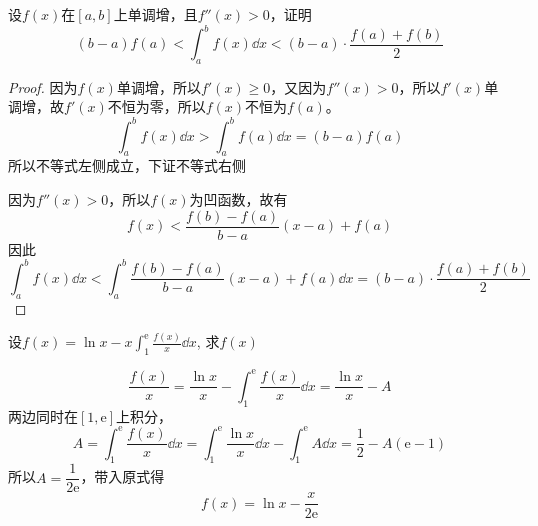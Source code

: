 \begin{example}
    设$f(x)$在$[a,b]$上单调增，且$f''(x)>0$，证明
    \[ (b-a)f(a)<\int_a^bf(x)\dd{x} < (b-a)\cdot\frac{f(a)+f(b)}{2} \]
\end{example}
\begin{marginfigure}
    \caption{$S_\mathrm{A} < S_\mathrm{A}+S_\mathrm{B} < S_\text{A}+S_\mathrm{B}+S_\mathrm{C} $}
\end{marginfigure}
\begin{proof}
    因为$f(x)$单调增，所以$f'(x)\geq 0$，又因为$f''(x)>0$，所以$f'(x)$单调增，故$f'(x)$不恒为零，所以$f(x)$不恒为$f(a)$。
    \[ \int_a^bf(x)\dd{x} > \int_a^b f(a)\dd{x} =(b-a)f(a) \]
    所以不等式左侧成立，下证不等式右侧

    因为$f''(x)>0$，所以$f(x)$为凹函数，故有
    \[ f(x) < \frac{f(b)-f(a)}{b-a}(x-a) + f(a) \]
    因此
    \[
        \int_a^bf(x)\dd{x}
        <
        \int_a^b \frac{f(b)-f(a)}{b-a}(x-a) + f(a) \dd{x}
        =
        (b-a)\cdot\frac{f(a)+f(b)}{2}
    \]
\end{proof}

\begin{example}
    设$\displaystyle f(x) = \ln x - x\int_1^\mathrm{e}\frac{f(x)}{x}\dd{x}$,
    求$f(x)$
\end{example}
\begin{solution}
    \[
        \frac{f(x)}{x} = \frac{\ln x}{x} - \int_1^\mathrm{e}\frac{f(x)}{x}\dd{x}
        =
        \frac{\ln x}{x} - A
    \]
    两边同时在$[1,\mathrm{e}]$上积分，
    \[
        A
        =
        \int_1^\mathrm{e}\frac{f(x)}{x}\dd{x}
        =
        \int_1^\mathrm{e}\frac{\ln x}{x}\dd{x} - \int_1^\mathrm{e} A\dd{x}
        =
        \frac{1}{2} - A(\mathrm{e}-1)
    \]
    所以$A = \dfrac{1}{2\mathrm{e}}$，带入原式得
    \[ f(x) = \ln x - \frac{x}{2\mathrm{e}} \]
\end{solution}

